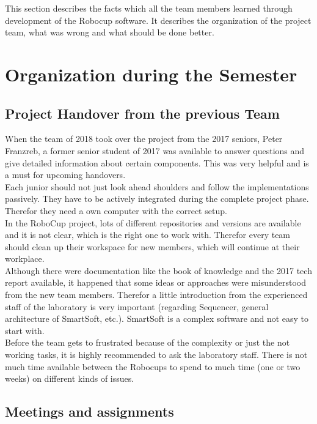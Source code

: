 This section describes the facts which all the team members learned through development of the Robocup software. It describes the organization of the 
project team, what was wrong and what should be done better.

\section{Organization during the Semester}
 
\subsection{Project Handover from the previous Team}

When the team of 2018 took over the project from the 2017 seniors, Peter Franzreb, a former senior student of 2017 was available to answer questions and give detailed information about certain components. This was very helpful and is a must for upcoming handovers. \\

Each junior should not just look ahead shoulders and follow the implementations passively. They have to be actively integrated during the complete project phase. Therefor they need a own computer with the correct setup. \\

In the RoboCup project, lots of different repositories and versions are available and it is not clear, which is the right one to work with. Therefor every team should clean up their workspace for new members, which will continue at their workplace. \\

 Although there were documentation like the book of knowledge \cite{BOK} and the 2017 tech report available, it happened that some ideas or approaches were misunderstood from the new team members. Therefor a little introduction from the experienced staff of the laboratory is very important (regarding Sequencer, general architecture of SmartSoft, etc.). SmartSoft is a complex software and not easy to start with.\\
 
 Before the team gets to frustrated because of the complexity or just the not working tasks, it is highly recommended to ask the laboratory staff. There is not much time available between the Robocups to spend to much time (one or two weeks) on different kinds of issues.
 
\subsection{Meetings and assignments}

